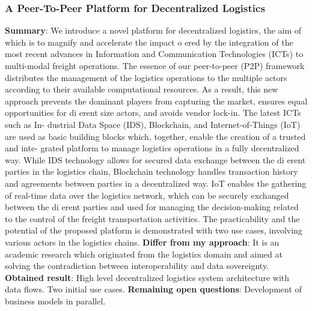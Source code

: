 \subsubsection{A Peer-To-Peer Platform for Decentralized Logistics \cite{peer-to-peerDecentralizedLogistics}}
\textbf{Summary}: We introduce a novel platform for decentralized logistics, the aim of which is to magnify and accelerate the impact o ered by the integration of the most recent advances in Information and Communication Technologies (ICTs) to multi-modal freight operations. The essence of our peer-to-peer (P2P) framework distributes the management of the logistics operations to the multiple actors according to their available computational resources. As a result, this new approach prevents the dominant players from capturing the market, ensures equal opportunities for di erent size actors, and avoids vendor lock-in. The latest ICTs such as In- dustrial Data Space (IDS), Blockchain, and Internet-of-Things (IoT) are used as basic building blocks which, together, enable the creation of a trusted and inte- grated platform to manage logistics operations in a fully decentralized way. While IDS technology allows for secured data exchange between the di erent parties in the logistics chain, Blockchain technology handles transaction history and agreements between parties in a decentralized way. IoT enables the gathering of real-time data over the logistics network, which can be securely exchanged between the di erent parties and used for managing the decision-making related to the control of the freight transportation activities. The practicability and the potential of the proposed platform is demonstrated with two use cases, involving various actors in the logistics chains.\newline
\textbf{Differ from my approach}: It is an academic research which originated from the logistics domain and aimed at solving the contradiction between interoperability and data sovereignty.\newline
\textbf{Obtained result}: High level decentralized logistics system architecture with data flows. Two initial use cases.\newline
\textbf{Remaining open questions}: Development of business models in parallel.\newline
